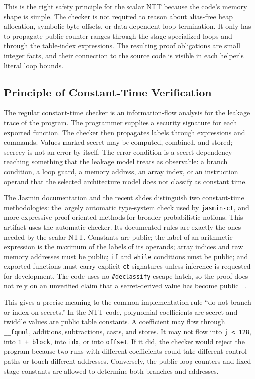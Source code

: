 \documentclass[10pt,twocolumn]{article}
\newcommand{\jasmin}{Jasmin}
\newcommand{\ct}{constant-time}
\begin{document}
This is the right safety principle for the scalar NTT because the code's memory
shape is simple.  The checker is not required to reason about alias-free heap
allocation, symbolic byte offsets, or data-dependent loop termination.  It only
has to propagate public counter ranges through the stage-specialized loops and
through the table-index expressions.  The resulting proof obligations are small
integer facts, and their connection to the source code is visible in each
helper's literal loop bounds.

\subsection{Principle of Constant-Time Verification}

The regular \ct{} checker is an information-flow analysis for the leakage trace
of the program.  The programmer supplies a security signature for each exported
function.  The checker then propagates labels through expressions and commands.
Values marked secret may be computed, combined, and stored; secrecy is not an
error by itself.  The error condition is a secret dependency reaching something
that the leakage model treats as observable: a branch condition, a loop guard,
a memory address, an array index, or an instruction operand that the selected
architecture model does not classify as constant time.

The \jasmin{} documentation and the recent slides distinguish two
constant-time methodologies: the
largely automatic type-system check used by \texttt{jasmin-ct}, and more
expressive proof-oriented methods for broader probabilistic notions.  This
artifact uses the automatic checker.  Its documented rules are exactly the ones
needed by the scalar NTT.  Constants are public; the label of an arithmetic
expression is the maximum of the labels of its operands; array indices and raw
memory addresses must be public; \texttt{if} and \texttt{while} conditions must
be public; and exported functions must carry explicit \texttt{ct} signatures
unless inference is requested for development.  The code uses no
\texttt{\#declassify} escape hatch, so the proof does not rely on an unverified
claim that a secret-derived value has become public
~\cite{JasminWorkbench2023,JasminFramework2026}.

This gives a precise meaning to the common implementation rule ``do not branch
or index on secrets.''  In the NTT code, polynomial coefficients are secret and
twiddle values are public table constants.  A coefficient may flow through
\texttt{\_\_fqmul}, additions, subtractions, casts, and stores.  It may not flow
into \texttt{j < 128}, into \texttt{1 + block}, into \texttt{idx}, or into
\texttt{offset}.  If it did, the checker would reject the program because two
runs with different coefficients could take different control paths or touch
different addresses.  Conversely, the public loop counters and fixed stage
constants are allowed to determine both branches and addresses.
\end{document}
